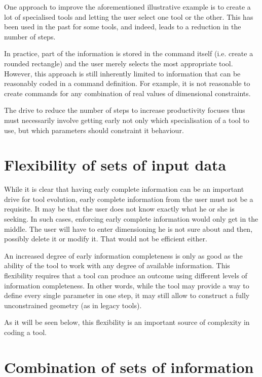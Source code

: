 \documentclass[12pt,twoside,a4paper]{book}
\begin{document}
    One approach to improve the aforementioned illustrative example is to create a lot of specialised tools and letting the user select one tool or the other. This has been used in the past for some tools, and indeed, leads to a reduction in the number of steps.

    In practice, part of the information is stored in the command itself (i.e. create a rounded rectangle) and the user merely selects the most appropriate tool. However, this approach is still inherently limited to information that can be reasonably coded in a command definition. For example, it is not reasonable to create commands for any combination of real values of dimensional constraints.

    The drive to reduce the number of steps to increase productivity focuses thus must necessarily involve getting early not only which specialisation of a tool to use, but which parameters should constraint it behaviour.

    \section{Flexibility of sets of input data}

    While it is clear that having early complete information can be an important drive for tool evolution, early complete information from the user must not be a requisite. It may be that the user does not know exactly what he or she is seeking. In such cases, enforcing early complete information would only get in the middle. The user will have to enter dimensioning he is not sure about and then, possibly delete it or modify it. That would not be efficient either.

    An increased degree of early information completeness is only as good as the ability of the tool to work with any degree of available information. This flexibility requires that a tool can produce an outcome using different levels of information completeness. In other words, while the tool may provide a way to define every single parameter in one step, it may still allow to construct a fully unconstrained geometry (as in legacy tools).

    As it will be seen below, this flexibility is an important source of complexity in coding a tool.

    \section{Combination of sets of information}
\end{document}
